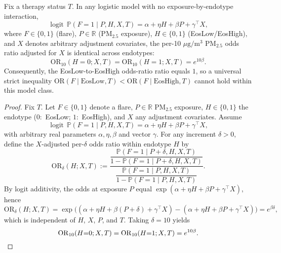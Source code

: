 ﻿\begin{proposition}\label{prop:logit-equal-or}
Fix a therapy status $T$. In any logistic model with no exposure-by-endotype interaction,
\[
\operatorname{logit}\,\mathbb{P}(F{=}1\mid P,H,X,T)=\alpha+\eta H+\beta P+\gamma^{\top}X,
\]
where $F\in\{0,1\}$ (flare), $P\in\mathbb{R}$ (PM$_{2.5}$ exposure), $H\in\{0,1\}$ (EosLow/EosHigh), and $X$ denotes arbitrary adjustment covariates, the per-10 $\mu\mathrm{g}/\mathrm{m}^3$ PM$_{2.5}$ odds ratio adjusted for $X$ is identical across endotypes:
\[
\mathrm{OR}_{10}(H{=}0;X,T)=\mathrm{OR}_{10}(H{=}1;X,T)=e^{10\beta}.
\]
Consequently, the EosLow-to-EosHigh odds-ratio ratio equals $1$, so a universal strict inequality $\mathrm{OR}(F\mid \text{EosLow},T)<\mathrm{OR}(F\mid \text{EosHigh},T)$ cannot hold within this model class.
\end{proposition}

\begin{proof}
Fix $T$. Let $F\in\{0,1\}$ denote a flare, $P\in\mathbb{R}$ PM$_{2.5}$ exposure, $H\in\{0,1\}$ the endotype ($0$:\ EosLow; $1$:\ EosHigh), and $X$ any adjustment covariates. Assume
\[
\operatorname{logit}\,\mathbb{P}(F{=}1\mid P,H,X,T)=\alpha+\eta H+\beta P+\gamma^{\top}X,
\]
with arbitrary real parameters $\alpha,\eta,\beta$ and vector $\gamma$. For any increment $\delta>0$, define the $X$-adjusted per-$\delta$ odds ratio within endotype $H$ by
\[
\mathrm{OR}_\delta(H;X,T)
:=\frac{\dfrac{\mathbb{P}(F{=}1\mid P{+}\delta,H,X,T)}{1-\mathbb{P}(F{=}1\mid P{+}\delta,H,X,T)}}{\dfrac{\mathbb{P}(F{=}1\mid P,H,X,T)}{1-\mathbb{P}(F{=}1\mid P,H,X,T)}}.
\]
By logit additivity, the odds at exposure $P$ equal $\exp(\alpha+\eta H+\beta P+\gamma^{\top}X)$, hence
\[
\mathrm{OR}_\delta(H;X,T)=\exp\big((\alpha+\eta H+\beta(P{+}\delta)+\gamma^{\top}X)-(\alpha+\eta H+\beta P+\gamma^{\top}X)\big)=e^{\beta\delta},
\]
which is independent of $H$, $X$, $P$, and $T$. Taking $\delta=10$ yields
\[
\mathrm{OR}_{10}(H{=}0;X,T)=\mathrm{OR}_{10}(H{=}1;X,T)=e^{10\beta}.\qedhere
\]
\end{proof}